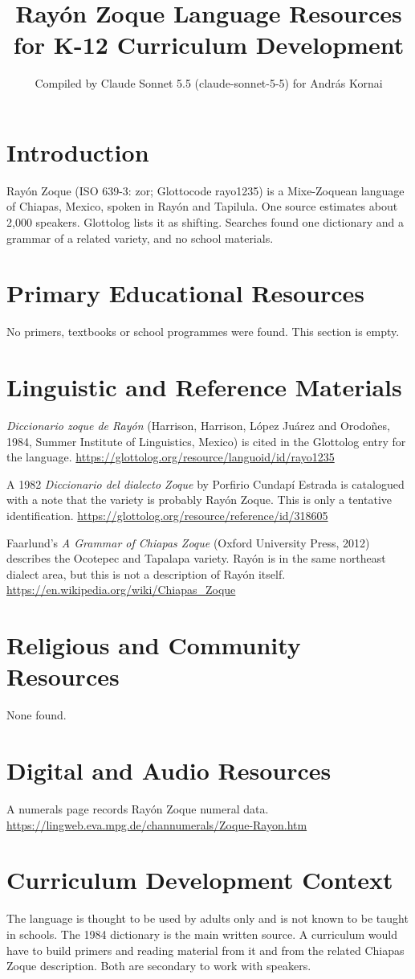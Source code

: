 \documentclass[12pt]{article}
\title{Ray\'on Zoque Language Resources for K-12 Curriculum Development}
\author{Compiled by Claude Sonnet 5.5 (claude-sonnet-5-5) for Andr\'as Kornai}
\date{}
\begin{document}
\maketitle

\section{Introduction}
Ray\'on Zoque (ISO 639-3: zor; Glottocode rayo1235) is a Mixe-Zoquean language of Chiapas, Mexico, spoken in Ray\'on and Tapilula. One source estimates about 2,000 speakers. Glottolog lists it as shifting. Searches found one dictionary and a grammar of a related variety, and no school materials.

\section{Primary Educational Resources}
No primers, textbooks or school programmes were found. This section is empty.

\section{Linguistic and Reference Materials}
\textit{Diccionario zoque de Ray\'on} (Harrison, Harrison, L\'opez Ju\'arez and Orodo\~nes, 1984, Summer Institute of Linguistics, Mexico) is cited in the Glottolog entry for the language. \url{https://glottolog.org/resource/languoid/id/rayo1235}

A 1982 \textit{Diccionario del dialecto Zoque} by Porfirio Cundap\'i Estrada is catalogued with a note that the variety is probably Ray\'on Zoque. This is only a tentative identification. \url{https://glottolog.org/resource/reference/id/318605}

Faarlund's \textit{A Grammar of Chiapas Zoque} (Oxford University Press, 2012) describes the Ocotepec and Tapalapa variety. Ray\'on is in the same northeast dialect area, but this is not a description of Ray\'on itself. \url{https://en.wikipedia.org/wiki/Chiapas_Zoque}

\section{Religious and Community Resources}
None found.

\section{Digital and Audio Resources}
A numerals page records Ray\'on Zoque numeral data. \url{https://lingweb.eva.mpg.de/channumerals/Zoque-Rayon.htm}

\section{Curriculum Development Context}
The language is thought to be used by adults only and is not known to be taught in schools. The 1984 dictionary is the main written source. A curriculum would have to build primers and reading material from it and from the related Chiapas Zoque description. Both are secondary to work with speakers.
\end{document}
